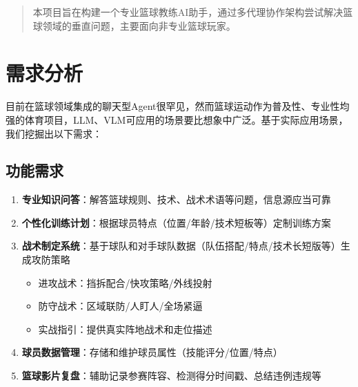\documentclass{article}
\theoremstyle{plain}
\theoremstyle{definition}
\theoremstyle{remark}
\begin{document}

\begin{abstract}
本项目旨在构建一个专业篮球教练AI助手，通过多代理协作架构尝试解决篮球领域的垂直问题，主要面向非专业篮球玩家。
\end{abstract}

\section{需求分析}
目前在篮球领域集成的聊天型Agent很罕见，然而篮球运动作为普及性、专业性均强的体育项目，LLM、VLM可应用的场景要比想象中广泛。基于实际应用场景，我们挖掘出以下需求：

\subsection{功能需求}
\begin{enumerate}
    \item \textbf{专业知识问答}：解答篮球规则、技术、战术术语等问题，信息源应当可靠
    \item \textbf{个性化训练计划}：根据球员特点（位置/年龄/技术短板等）定制训练方案
    \item \textbf{战术制定系统}：基于球队和对手球队数据（队伍搭配/特点/技术长短版等）生成攻防策略
    \begin{itemize}
        \item 进攻战术：挡拆配合/快攻策略/外线投射
        \item 防守战术：区域联防/人盯人/全场紧逼
        \item 实战指引：提供真实阵地战术和走位描述
    \end{itemize}
    \item \textbf{球员数据管理}：存储和维护球员属性（技能评分/位置/特点）
    \item \textbf{篮球影片复盘}：辅助记录参赛阵容、检测得分时间戳、总结违例违规等
\end{enumerate}
\end{document}
